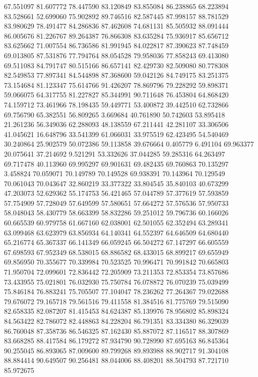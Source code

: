 67.551097
81.607772
78.447590
83.120849
83.855084
86.238865
68.223894
83.528661
52.699060
75.902892
89.746516
82.587445
87.998157
88.781529
83.980629
78.491477
84.286836
87.462608
74.681131
85.505932
88.091444
86.005676
81.226767
89.264387
76.866308
83.635284
75.936917
85.656712
83.625662
71.007554
86.736586
81.991945
84.022817
87.390623
87.748459
69.013805
87.531876
77.794764
88.054528
79.958036
77.858243
69.413080
69.511083
84.791747
80.515166
86.657141
82.429730
82.509080
80.778308
82.549853
77.897341
84.544898
87.368600
59.042126
84.749175
83.251375
73.154684
81.123347
75.614766
91.426207
78.869796
79.228292
59.898371
59.066075
64.317755
81.227827
85.344991
90.711648
76.453804
64.868420
74.159712
73.461966
78.198435
59.449771
53.400872
39.442510
62.732866
69.756790
65.382551
56.809265
3.669684
40.761890
50.742603
53.895418
21.261236
56.349036
62.288093
48.138559
67.211441
42.281107
33.306506
41.045621
16.648796
33.541399
61.066031
33.975519
62.423495
54.540469
30.240864
25.902579
50.072386
59.113858
39.676664
0.405779
6.491104
69.963377
20.075641
37.214692
9.521291
53.332626
37.044285
59.285316
64.263497
69.717478
40.113960
69.995297
69.901631
69.482435
69.760863
70.135297
3.458824
70.059071
70.149789
70.149528
69.938391
70.143964
70.129549
70.061043
70.043647
32.860219
33.377322
33.804545
35.840103
40.673299
47.203073
52.629362
55.174753
56.421465
57.044789
57.377619
57.593859
57.754909
57.728049
57.649599
57.580651
57.664272
57.576536
57.950733
58.048043
58.430779
58.663399
58.832286
59.251012
59.796736
60.166026
60.665539
60.979758
61.667160
62.038001
62.501055
62.352494
63.289341
63.099468
63.623979
63.856934
64.140341
64.552397
64.646509
64.680440
65.216774
65.367337
66.141349
66.059245
66.504272
67.147297
66.605559
67.698593
67.952349
68.538015
68.886582
68.433015
68.899217
69.655949
69.856950
70.355677
70.339984
70.523525
70.996471
70.991842
70.665803
71.950704
72.099601
72.836442
72.205909
73.211353
72.853354
73.857686
73.433955
75.021801
76.032930
75.750784
76.078872
76.070239
75.039499
75.846184
76.883241
75.705507
77.104047
78.236262
77.264367
79.022688
79.676072
79.165718
79.561516
79.411558
81.384516
81.775769
79.515090
82.658335
82.087207
81.415453
84.624387
85.139976
78.956802
85.898324
84.563422
82.786072
82.448863
84.228204
86.791351
83.334380
86.329039
86.760048
87.358736
86.546325
87.162430
85.887072
87.116517
88.307869
83.668285
88.417584
86.179272
87.934790
90.728990
87.695163
86.845364
90.255045
86.893065
87.009600
89.799268
89.893988
88.902717
91.304108
88.884414
90.649507
90.256481
88.044006
88.408201
88.504793
87.721710
85.972675

